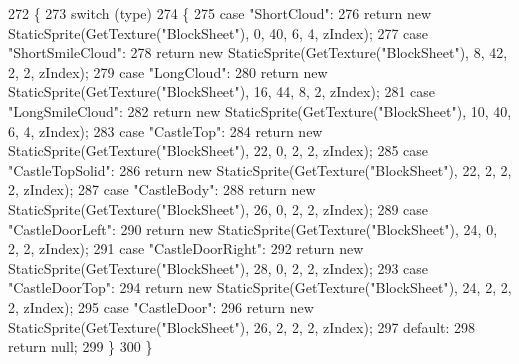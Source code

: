 \begin{DoxyCode}
272         \{
273             \textcolor{keywordflow}{switch} (type)
274             \{
275                 \textcolor{keywordflow}{case} \textcolor{stringliteral}{"ShortCloud"}:
276                     \textcolor{keywordflow}{return} \textcolor{keyword}{new} StaticSprite(GetTexture(\textcolor{stringliteral}{"BlockSheet"}), 0, 40, 6, 4, zIndex);
277                 \textcolor{keywordflow}{case} \textcolor{stringliteral}{"ShortSmileCloud"}:
278                     \textcolor{keywordflow}{return} \textcolor{keyword}{new} StaticSprite(GetTexture(\textcolor{stringliteral}{"BlockSheet"}), 8, 42, 2, 2, zIndex);
279                 \textcolor{keywordflow}{case} \textcolor{stringliteral}{"LongCloud"}:
280                     \textcolor{keywordflow}{return} \textcolor{keyword}{new} StaticSprite(GetTexture(\textcolor{stringliteral}{"BlockSheet"}), 16, 44, 8, 2, zIndex);
281                 \textcolor{keywordflow}{case} \textcolor{stringliteral}{"LongSmileCloud"}:
282                     \textcolor{keywordflow}{return} \textcolor{keyword}{new} StaticSprite(GetTexture(\textcolor{stringliteral}{"BlockSheet"}), 10, 40, 6, 4, zIndex);
283                 \textcolor{keywordflow}{case} \textcolor{stringliteral}{"CastleTop"}:
284                     \textcolor{keywordflow}{return} \textcolor{keyword}{new} StaticSprite(GetTexture(\textcolor{stringliteral}{"BlockSheet"}), 22, 0, 2, 2, zIndex);
285                 \textcolor{keywordflow}{case} \textcolor{stringliteral}{"CastleTopSolid"}:
286                     \textcolor{keywordflow}{return} \textcolor{keyword}{new} StaticSprite(GetTexture(\textcolor{stringliteral}{"BlockSheet"}), 22, 2, 2, 2, zIndex);
287                 \textcolor{keywordflow}{case} \textcolor{stringliteral}{"CastleBody"}:
288                     \textcolor{keywordflow}{return} \textcolor{keyword}{new} StaticSprite(GetTexture(\textcolor{stringliteral}{"BlockSheet"}), 26, 0, 2, 2, zIndex);
289                 \textcolor{keywordflow}{case} \textcolor{stringliteral}{"CastleDoorLeft"}:
290                     \textcolor{keywordflow}{return} \textcolor{keyword}{new} StaticSprite(GetTexture(\textcolor{stringliteral}{"BlockSheet"}), 24, 0, 2, 2, zIndex);
291                 \textcolor{keywordflow}{case} \textcolor{stringliteral}{"CastleDoorRight"}:
292                     \textcolor{keywordflow}{return} \textcolor{keyword}{new} StaticSprite(GetTexture(\textcolor{stringliteral}{"BlockSheet"}), 28, 0, 2, 2, zIndex);
293                 \textcolor{keywordflow}{case} \textcolor{stringliteral}{"CastleDoorTop"}:
294                     \textcolor{keywordflow}{return} \textcolor{keyword}{new} StaticSprite(GetTexture(\textcolor{stringliteral}{"BlockSheet"}), 24, 2, 2, 2, zIndex);
295                 \textcolor{keywordflow}{case} \textcolor{stringliteral}{"CastleDoor"}:
296                     \textcolor{keywordflow}{return} \textcolor{keyword}{new} StaticSprite(GetTexture(\textcolor{stringliteral}{"BlockSheet"}), 26, 2, 2, 2, zIndex);
297                 \textcolor{keywordflow}{default}:
298                     \textcolor{keywordflow}{return} null;
299             \}
300         \}
\end{DoxyCode}
